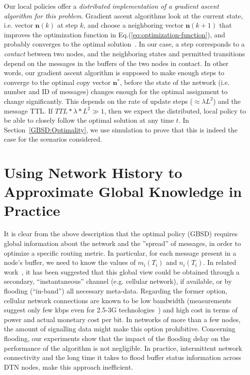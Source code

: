 Our local policies offer a \emph{distributed implementation of a gradient ascent algorithm for this problem}. Gradient ascent algorithms look at the current state, i.e. vector $\mathbf{n}(k)$ at step $k$, and choose a neighboring vector $\mathbf{n}(k+1)$ that improves the optimization function in Eq.(\ref{eq:optimization-function}), and probably converges to the optimal solution~\cite{Boyd:convex-optimization-book}. In our case, a step corresponds to a \emph{contact} between two nodes, and the neighboring states and permitted transitions depend on the messages in the buffers of the two nodes in contact. In other words, our gradient ascent algorithm is supposed to make enough steps to converge to the optimal copy vector $\mathbf{n^{*}}$, before the state of the network (i.e. number and ID of messages) changes enough for the optimal assignment to change significantly. This depends on the rate of update steps ($\approx \lambda L^{2}$) and the message TTL. If $TTL * \lambda * L^{2} \gg 1$, then we expect the distributed, local policy to be able to closely follow the optimal solution at any time $t$. In Section~\ref{GBSD:Optimality}, we use simulation to prove that this is indeed the case for the scenarios considered.

\section{Using Network History to Approximate Global Knowledge in Practice}
\label{sec:learning}

It is clear from the above description that the optimal policy (GBSD) requires global information about the network and the ''spread'' of messages, in order to optimize a specific routing metric. In particular, for each message present in a node's buffer, we need to know the values of $m_i(T_i)$ and $n_i(T_i)$. In related work~\cite{Levine:Sigcomm07}, it has been suggested that this global view could be obtained through a secondary, ``instantaneous'' channel (e.g. cellular network), if available, or by flooding (``in-band'') all necessary meta-data. Regarding the former option, cellular network connections are known to be low bandwidth (measurements suggest only few kbps even for 2.5-3G technologies~\cite{Keshav:multi-nic}) and high cost in terms of power and actual monetary cost per bit. In networks of more than a few nodes, the amount of signalling data might make this option prohibitive. Concerning flooding, our experiments show that the impact of the flooding delay on the performance of the algorithm is not negligible. In practice, intermittent network connectivity and the long time it takes to flood buffer status information across DTN nodes, make this approach inefficient.

